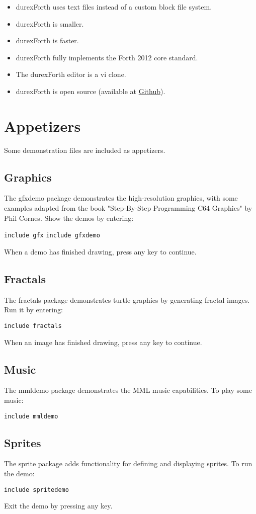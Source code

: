 \begin{itemize}
\item durexForth uses text files instead of a custom block file system.
\item durexForth is smaller.
\item durexForth is faster.
\item durexForth fully implements the Forth 2012 core standard.
\item The durexForth editor is a vi clone.
\item durexForth is open source (available at \href{https://github.com/jkotlinski/durexforth}{Github}).
\end{itemize}

\section{Appetizers}

Some demonstration files are included as appetizers.

\subsection{Graphics}

The gfxdemo package demonstrates the high-resolution graphics, with some examples adapted from the book "Step-By-Step Programming C64 Graphics" by Phil Cornes. 
Show the demos by entering:

\texttt{include gfx}
\texttt{include gfxdemo}

When a demo has finished drawing, press any key to continue.

\subsection{Fractals}

The fractals package demonstrates turtle graphics by generating fractal images. Run it by entering:

\texttt{include fractals}

When an image has finished drawing, press any key to continue.

\subsection{Music}

The mmldemo package demonstrates the MML music capabilities. To play some music:

\texttt{include mmldemo}

\subsection{Sprites}

The sprite package adds functionality for defining and displaying sprites. To run the demo:

\texttt{include spritedemo}

Exit the demo by pressing any key.
